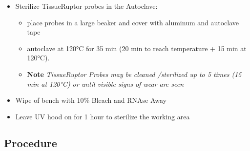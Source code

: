 \documentclass[
  letterpaper,
  DIV=11,
  numbers=noendperiod]{scrreprt}
\begin{document}
\begin{itemize}
\item
  Sterilize TissueRuptor probes in the Autoclave:

  \begin{itemize}
  \item
    place probes in a large beaker and cover with aluminum and autoclave
    tape
  \item
    autoclave at 120°C for 35 min (20 min to reach temperature + 15 min
    at 120°C).
  \item
    \textbf{Note} \emph{TissueRuptor Probes may be cleaned /sterilized
    up to 5 times (15 min at 120°C) or until visible signs of wear are
    seen}
  \end{itemize}
\item
  Wipe of bench with 10\% Bleach and RNAse Away
\item
  Leave UV hood on for 1 hour to sterilize the working area
\end{itemize}

\hypertarget{procedure-2}{%
\subsection*{\texorpdfstring{\textbf{Procedure}}{Procedure}}\label{procedure-2}}
\end{document}

